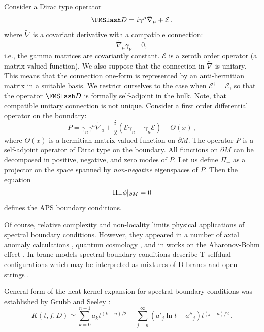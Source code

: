 Consider a Dirac type operator 
\begin{equation}
\Dir =i \gamma^\mu \tilde \nabla_\mu +\mathcal{E}\,,\label{gDir}
\end{equation}
where $\tilde\nabla$ is a covariant derivative with a compatible
connection:
\begin{equation}
\tilde \nabla_\mu \gamma_\nu =0,\label{compaticon}
\end{equation}
i.e., the gamma matrices are covariantly constant. $\mathcal{E}$
is a zeroth order operator (a matrix valued function). We also 
suppose that the connection in $\tilde\nabla$ is unitary. This means
that the connection one-form is represented by an anti-hermitian
matrix in a suitable basis. We restrict ourselves to the case
when $\mathcal{E}^\dag =\mathcal{E}$, so that the operator
$\Dir$ is formally self-adjoint in the bulk. Note, that compatible
unitary connection is not unique. 
Consider a first
order differential operator on the boundary:
\begin{equation}
P=\gamma_n \gamma^a \tilde\nabla_a +\frac i2 \left(
\mathcal{E}\gamma_n -\gamma_n \mathcal{E} \right) +\Theta (x)\,,
\label{Poper}
\end{equation}
where $\Theta (x)$ is a hermitian matrix valued function on $\partial M$.
The operator $P$ is a self-adjoint operator of Dirac type on the boundary. 
All functions on $\partial M$ can be decomposed in positive, negative,
and zero modes of $P$. Let us define $\Pi_-$ as a projector on the
space spanned by {\it non-negative} eigenspaces of $P$. Then the
equation
\begin{equation}
\Pi_-\phi \vert_{\partial M}=0 \label{APSPmin}
\end{equation}
defines the APS boundary conditions. 

Of course, relative complexity and non-locality limits physical
applications of spectral boundary conditions. However, they appeared
in a number of axial anomaly calculations 
\cite{Romer:1977qq,Hortacsu:1980kv,Hortacsu:1983iq,
Ninomiya:1985ge,Niemi:1986ht,Ma:1986qp,
Forgacs:1987ti,Falomir:1998as}, quantum cosmology \cite{D'Eath:1991sz},
and in works on the Aharonov-Bohm effect
\cite{Mishchenko:1992vm,Beneventano:1998ai}.
In brane models spectral boundary conditions describe T-selfdual
configurations which may be interpreted as mixtures of D-branes
and open strings \cite{Vassilevich:2001at}.

General form of the heat kernel expansion for spectral boundary
conditions was established by
Grubb and Seeley \cite{GS:1993,GS:1995,GS:1996}:
\begin{equation}
K(t,f,D)\simeq \sum_{k=0}^{n-1} a_kt^{(k-n)/2}
+\sum_{j=n}^\infty \left( a'_j \ln t +a''_j \right)
t^{(j-n)/2} \,.\label{APSasymp}
\end{equation}

